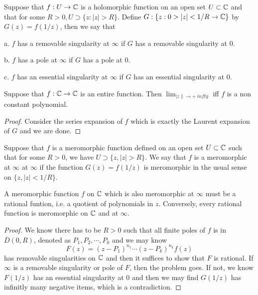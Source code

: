 \begin{definition}
    Suppose that $f:U\to \mathbb{C}$ is a holomorphic function on an open set $U\subset\mathbb{C}$ and that for some $R>0, U\supset \{z:|z|>R\}$. Define
    $G:\{z:0>|z|<1/R \to \mathbb{C}\}$ by $G(z) = f(1/z)$, then we say that\par
    a. $f$ has a removable singularity at $\infty$ if $G$ has a removable singularity at $0$.\par
    b. $f$ has a pole at $\infty$ if $G$ has a pole at $0$.\par
    c. $f$ has an essential singularity at $\infty$ if $G$ has an essential singularity at $0$.
\end{definition}

\begin{theorem}
    Suppose that $f:\mathbb{C}\to\mathbb{C}$ is an entire function. Then $\lim_{|z\|\to +\ infty}$ iff $f$ is a non constant polynomial.
\end{theorem}
\begin{proof}\par
    Consider the series expansion of $f$ which is exactly the Laurent expansion of $G$ and we are done.
\end{proof}

\begin{definition}
    Suppose that $f$ is a meromorphic function defined on an open set $U\subset\mathbb{C}$ such that for some $R>0$, we have $U\supset\{z, |z|>R\}$. We say that $f$ is a meromorphic at $\infty$ at $\infty$ if the function $G(z) = f(1/z)$ is meromorphic in the usual sense on $\{z,|z|<1/R\}$.
\end{definition}

\begin{theorem}
    A meromorphic function $f$ on $\mathbb{C}$ which is also meromorphic at $\infty$ must be a rational funtion, i.e. a quotient of polynomials in $z$. Conversely, every rational function is meromorphic on $\mathbb{C}$ and at $\infty$.
\end{theorem}
\begin{proof}\par
    We know there has to be $R>0$ such that all finite poles of $f$ is in $\overline{D}(0,R)$, denoted as $P_1,P_2,\cdots,P_k$ and we may know
    \[F(z) = (z-P_1)^{n_1}\cdots(z-P_k)^{n_k}f(z)\]
    has removable singularities on $\mathbb{C}$ and then it suffices to show that $F$ is rational. If $\infty$ is a removable singularity or pole of $F$, then the problem goes. If not, we know $F(1/z)$ has an essential singularity at $0$ and then we may find $G(1/z)$ has infinitly many negative items, which is a contradiction. 
\end{proof}

